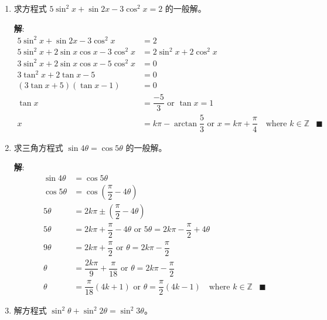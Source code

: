 \documentclass{report}
\newcommand{\sol}{\vspace{0.2cm}\textbf{解}:}
\begin{document}
\begin{enumerate}[leftmargin=*]
        \item 求方程式 $5 \sin ^2 x+\sin 2 x-3 \cos ^2 x=2$ 的一般解。
        
        \sol{}
        \begin{align*}
            5 \sin ^2 x+\sin 2 x-3 \cos ^2 x &= 2\\
            5 \sin ^2 x + 2\sin x\cos x - 3\cos ^2 x &= 2\sin^2 x + 2\cos^2 x\\
            3\sin^2 x + 2\sin x\cos x - 5\cos^2 x &= 0\\
            3\tan^2 x + 2\tan x - 5 &= 0\\
            (3\tan x + 5)(\tan x - 1) &= 0\\
            \tan x &= \dfrac{-5}{3} \text{ or } \tan x = 1\\
            x &= k\pi - \arctan\dfrac{5}{3} \text{ or } x = k\pi + \dfrac{\pi}{4} \quad \text{where } k \in \mathbb{Z} & \blacksquare
        \end{align*}

        \item 求三角方程式 $\sin 4 \theta=\cos 5 \theta$ 的一般解。
        
        \sol{}
        \begin{align*}
            \sin 4 \theta &= \cos 5 \theta\\
            \cos 5\theta &= \cos\left(\dfrac{\pi}{2} - 4\theta\right)\\
            5\theta &= 2k\pi \pm \left(\dfrac{\pi}{2} - 4\theta\right)\\
            5\theta &= 2k\pi + \dfrac{\pi}{2} - 4\theta \text{ or } 5\theta = 2k\pi - \dfrac{\pi}{2} + 4\theta\\
            9\theta &= 2k\pi + \dfrac{\pi}{2} \text{ or } \theta = 2k\pi - \dfrac{\pi}{2}\\
            \theta &= \dfrac{2k\pi}{9} + \dfrac{\pi}{18} \text{ or } \theta = 2k\pi - \dfrac{\pi}{2}\\
            \theta &= \dfrac{\pi}{18}({4k + 1}) \text{ or } \theta = \dfrac{\pi}{2}({4k - 1}) \quad \text{where } k \in \mathbb{Z} & \blacksquare
        \end{align*}

        \item 解方程式 $\sin ^2 \theta+\sin ^2 2 \theta=\sin ^2 3 \theta$。
        

\end{enumerate}
\end{document}
